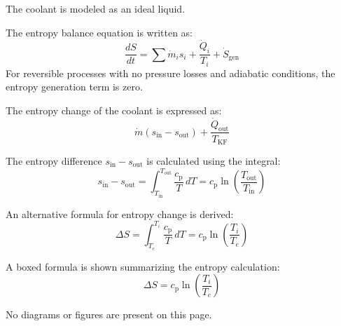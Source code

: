 The coolant is modeled as an ideal liquid.  

The entropy balance equation is written as:  
\[
\frac{dS}{dt} = \sum \dot{m}_i s_i + \frac{\dot{Q}_i}{T_i} + \dot{S}_{\text{gen}}
\]  
For reversible processes with no pressure losses and adiabatic conditions, the entropy generation term is zero.  

The entropy change of the coolant is expressed as:  
\[
\dot{m} \left( s_{\text{in}} - s_{\text{out}} \right) + \frac{\dot{Q}_{\text{out}}}{T_{\text{KF}}}
\]  

The entropy difference \( s_{\text{in}} - s_{\text{out}} \) is calculated using the integral:  
\[
s_{\text{in}} - s_{\text{out}} = \int_{T_{\text{in}}}^{T_{\text{out}}} \frac{c_{\text{p}}}{T} \, dT = c_{\text{p}} \ln \left( \frac{T_{\text{out}}}{T_{\text{in}}} \right)
\]  

An alternative formula for entropy change is derived:  
\[
\Delta S = \int_{T_e}^{T_i} \frac{c_{\text{p}}}{T} \, dT = c_{\text{p}} \ln \left( \frac{T_i}{T_e} \right)
\]  

A boxed formula is shown summarizing the entropy calculation:  
\[
\Delta S = c_{\text{p}} \ln \left( \frac{T_i}{T_e} \right)
\]  

No diagrams or figures are present on this page.